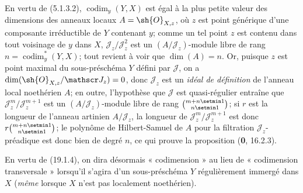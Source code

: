 En vertu de (5.1.3.2), $\operatorname{codim}_y(Y,X)$ est égal à la plus petite valeur des dimensions des anneaux locaux $A=\sh{O}_{X,z}$, où $z$ est point générique d'une composante
irréductible de $Y$ contenant $y$; comme un tel point $z$ est contenu dans tout voisinage de $y$ dans $X$, $\mathscr J_z/\mathscr J_z^2$ est un $(A/\mathscr J_z)$-module libre de rang $n=\operatorname{codim}_y^*(Y,X)$; tout revient à voir que $\dim(A)=n$. Or, puisque $z$ est point maximal du sous-préschéma $Y$ défini par $\mathscr J$, on a $\dim(\sh{O}_{X,z}/\mathscr J_z)=0$, donc $\mathscr J_z$ est un \emph{idéal de définition} de l'anneau local noethérien $A$; en outre, l'hypothèse que $\mathscr J$ est quasi-régulier entraîne que $\mathscr J_z^m/\mathscr J_z^{m+1}$ est un $(A/\mathscr J_z)$-module libre de rang $\binom{m+n\setmin 1}{n\setmin 1}$; si $r$ est la longueur de l'anneau artinien $A/\mathscr J_z$, la longueur de $\mathscr J_z^m/\mathscr J_z^{m+1}$ est donc $r\binom{m+n\setmin 1}{n\setmin 1}$; le polynôme de Hilbert-Samuel de $A$ pour la filtration $\mathscr J_z$-préadique est donc bien de degré $n$, ce qui prouve la proposition (\textbf{0}, 16.2.3).

En vertu de (19.1.4), on dira désormais « codimension » au lieu de « codimension transversale » lorsqu'il s'agira d'un sous-préschéma $Y$ régulièrement immergé dans $X$ (\emph{même} lorsque $X$ n'est pas localement noethérien).

